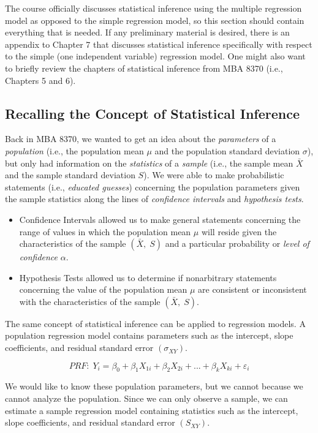\documentclass[
]{book}
\begin{document}
The course officially discusses statistical inference using the multiple regression model as opposed to the simple regression model, so this section should contain everything that is needed. If any preliminary material is desired, there is an appendix to Chapter 7 that discusses statistical inference specifically with respect to the simple (one independent variable) regression model. One might also want to briefly review the chapters of statistical inference from MBA 8370 (i.e., Chapters 5 and 6).

\subsection{Recalling the Concept of Statistical Inference}\label{recalling-the-concept-of-statistical-inference}

Back in MBA 8370, we wanted to get an idea about the \emph{parameters} of a \emph{population} (i.e., the population mean \(\mu\) and the population standard deviation \(\sigma\)), but only had information on the \emph{statistics} of a \emph{sample} (i.e., the sample mean \(\bar{X}\) and the sample standard deviation \(S\)). We were able to make probabilistic statements (i.e., \emph{educated guesses}) concerning the population parameters given the sample statistics along the lines of \emph{confidence intervals} and \emph{hypothesis tests}.

\begin{itemize}
\item
  Confidence Intervals allowed us to make general statements concerning the range of values in which the population mean \(\mu\) will reside given the characteristics of the sample \((\bar{X},\;S)\) and a particular probability or \emph{level of confidence} \(\alpha\).
\item
  Hypothesis Tests allowed us to determine if nonarbitrary statements concerning the value of the population mean \(\mu\) are consistent or inconsistent with the characteristics of the sample \((\bar{X},\;S)\).
\end{itemize}

The same concept of statistical inference can be applied to regression models. A population regression model contains parameters such as the intercept, slope coefficients, and residual standard error \((\sigma_{XY})\).

\[PRF:\;Y_i=\beta_0+\beta_1X_{1i}+\beta_2X_{2i}+...+\beta_kX_{ki}+\varepsilon_i\]

We would like to know these population parameters, but we cannot because we cannot analyze the population. Since we can only observe a sample, we can estimate a sample regression model containing statistics such as the intercept, slope coefficients, and residual standard error \((S_{XY})\).
\end{document}
